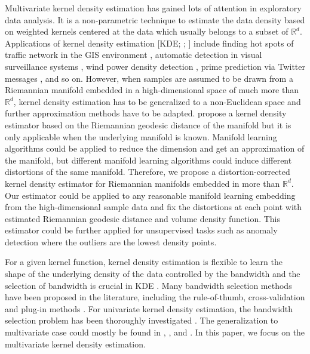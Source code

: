 \documentclass[11pt,a4paper,]{article}
\begin{document}
Multivariate kernel density estimation has gained lots of attention in exploratory data analysis. It is a non-parametric technique to estimate the data density based on weighted kernels centered at the data which usually belongs to a subset of \(\mathbb{R}^d\). Applications of kernel density estimation {[}KDE; \textcite{Parzen1962-gt}; \textcite{Chen2017-dw}{]} include finding hot spots of traffic network in the GIS environment \autocite{Xie2008-eb,Okabe2009-nb}, automatic detection in visual surveillance systems \autocite{Elgammal2002-cw}, wind power density detection \autocite{Jeon2012-ac}, prime prediction via Twitter messages \autocite{Gerber2014-tq}, and so on. However, when samples are assumed to be drawn from a Riemannian manifold embedded in a high-dimensional space of much more than \(\mathbb{R}^d\), kernel density estimation has to be generalized to a non-Euclidean space and further approximation methods have to be adapted. \textcite{Pelletier2005-vu} propose a kernel density estimator based on the Riemannian geodesic distance of the manifold but it is only applicable when the underlying manifold is known. Manifold learning algorithms could be applied to reduce the dimension and get an approximation of the manifold, but different manifold learning algorithms could induce different distortions of the same manifold. Therefore, we propose a distortion-corrected kernel density estimator for Riemannian manifolds embedded in more than \(\mathbb{R}^d\). Our estimator could be applied to any reasonable manifold learning embedding from the high-dimensional sample data and fix the distortions at each point with estimated Riemannian geodesic distance and volume density function. This estimator could be further applied for unsupervised tasks such as anomaly detection where the outliers are the lowest density points.

For a given kernel function, kernel density estimation is flexible to learn the shape of the underlying density of the data controlled by the bandwidth and the selection of bandwidth is crucial in KDE \autocite{Jones1990-oe,Terrell1992-ut}.
Many bandwidth selection methods have been proposed in the literature, including the rule-of-thumb, cross-validation \autocite{Jones1992-ta,Sain1994-gr} and plug-in methods \autocites[See][ for details]{Heidenreich2013-bl,Scott2015-vl}.
For univariate kernel density estimation, the bandwidth selection problem has been thoroughly investigated \autocites[See][ for reviews]{Jones1992-ef,Cao1994-st,Jones1996-cb,Wand1994-xu}. The generalization to multivariate case could mostly be found in \textcite{Duong2003-sp}, \textcite{Duong2004-rh}, and \textcite{Chacon2010-wm}. In this paper, we focus on the multivariate kernel density estimation.
\end{document}
